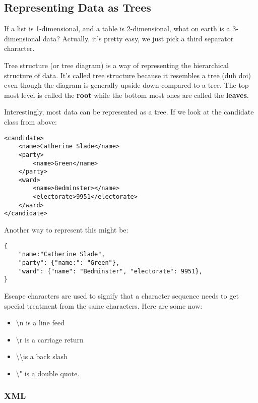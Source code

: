 \documentclass[11pt,a4paper,titlepage,dvipsnames,cmyk]{scrartcl}
\begin{document}
\subsection{Representing Data as Trees}%
\label{sub:tree-data}
If a list is 1-dimensional, and a table is 2-dimensional, what on earth is
a 3-dimensional data? Actually, it's pretty easy, we just pick a third
separator character.

Tree structure (or tree diagram) is a way of representing the hierarchical
structure of data. It's called tree structure because it resembles a tree
(duh doi) even though the diagram is generally upside down compared to a
tree. The top most level is called the \textbf{root} while the bottom most
ones are called the \textbf{leaves}.

Interestingly, most data can be represented as a tree. If we look at the
candidate class from above:

\begin{lstlisting}[style=B]
<candidate>
    <name>Catherine Slade</name>
    <party>
        <name>Green</name>
    </party>
    <ward>
        <name>Bedminster></name>
        <electorate>9951</electorate>
    </ward>
</candidate>
\end{lstlisting}

Another way to represent this might be:

\begin{lstlisting}[style=B]
{
    "name:"Catherine Slade",
    "party": {"name:": "Green"},
    "ward": {"name": "Bedminster", "electorate": 9951},
}
\end{lstlisting}

Escape characters are used to signify that a character sequence needs to
get special treatment from the same characters. Here are some now:

\begin{itemize}
    \item \textbackslash n is a line feed
    \item \textbackslash r is a carriage return
    \item \textbackslash \textbackslash \text{ }is a back slash
    \item \textbackslash " is a double quote.
\end{itemize}

\subsubsection{XML}%
\label{ssub:XML}
\end{document}

